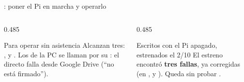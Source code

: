 \begin{frame}{: poner el Pi en marcha y operarlo}
  \vspace{0.4em}
  \begin{columns}[T,onlytextwidth]
    \begin{column}{0.485\textwidth}
      \begin{block}{Para operar sin asistencia}
        {\footnotesize Alcanzan tres: ,  y
        . Los de la PC se llaman por su : el
         directo falla desde Google Drive (``no está firmado'').}
      \end{block}
    \end{column}
    \begin{column}{0.485\textwidth}
      \begin{alertblock}{Escritos con el Pi apagado, estrenados el 2/10}
        {\footnotesize El estreno encontró \textbf{tres fallas}, ya corregidas
        (en ,  y ). Queda sin
        probar .}
      \end{alertblock}
    \end{column}
  \end{columns}
\end{frame}

